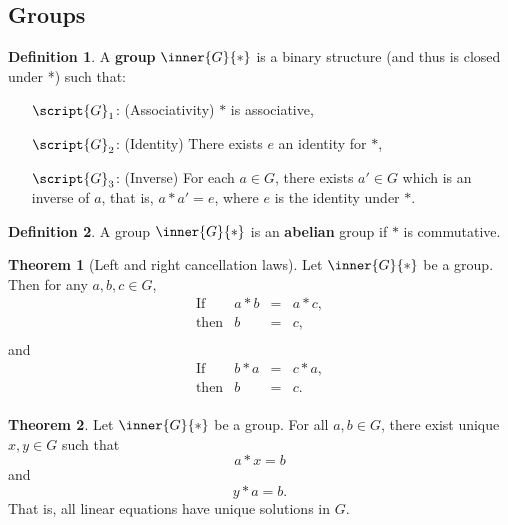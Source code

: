 \documentclass[a5paper]{article}
\theoremstyle{definition}%
\newtheorem*{theorem*}{Theorem} %
\newtheorem*{definition*}{Definition}
\numberwithin{exercise}{section}
\theoremstyle{remark}%
\begin{document}
\subsection{Groups}

\begin{highlight}
\begin{definition*}
A \textbf{group} $\inner{G}{*}$ is a binary structure (and thus is closed under *) such that:
	\begin{enumerate}
	\item[$\script{G}_1$:] (Associativity) $*$ is associative, 
	\item[$\script{G}_2$:] (Identity) There exists $e$ an identity for $*$,
	\item[$\script{G}_3$:] (Inverse) For each $a\in G$, there exists $a'\in G$ which is an inverse of $a$, that is, $a*a'=e$, where $e$ is the identity under $*$. 
	\end{enumerate}
\end{definition*}
\end{highlight}

\begin{definition*}
A group $\inner{G}{*}$ is an \textbf{abelian} group if $*$ is commutative. 
\end{definition*}

\begin{highlight}
\begin{theorem*}[Left and right cancellation laws]
Let $\inner{G}{*}$ be a group. Then for any $a,b,c\in G$, 
\[\begin{array}{lrcl}
\text{If} & a*b&=&a*c,\\
\text{then} & b&=&c,\\
\end{array}\]
and 
\[\begin{array}{lrcl}
\text{If} & b*a&=&c*a,\\
\text{then} & b&=&c.\\
\end{array}\]
\end{theorem*}
\end{highlight}

\begin{highlight}
\begin{theorem*}
Let $\inner{G}{*}$ be a group. For all $a,b\in G$, there exist unique $x,y\in G$ such that
$$a*x=b$$
and 
$$y*a=b.$$
That is, all linear equations have unique solutions in $G$. 
\end{theorem*}
\end{highlight}
\end{document}
